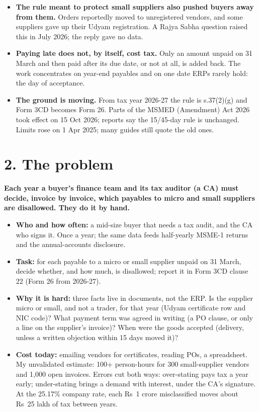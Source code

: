 \documentclass[10pt,a4paper]{article}
\providecommand{\tightlist}{\setlength{\itemsep}{1.5pt}\setlength{\parskip}{0pt}}
\begin{document}
\begin{itemize}
\tightlist
\item
  \textbf{The rule meant to protect small suppliers also pushed buyers away from them.} Orders reportedly moved to unregistered vendors, and some suppliers gave up their Udyam registration. A Rajya Sabha question raised this in July 2026; the reply gave no data.
\item
  \textbf{Paying late does not, by itself, cost tax.} Only an amount unpaid on 31 March and then paid after its due date, or not at all, is added back. The work concentrates on year-end payables and on one date ERPs rarely hold: the day of acceptance.
\item
  \textbf{The ground is moving.} From tax year 2026-27 the rule is s.37(2)(g) and Form 3CD becomes Form 26. Parts of the MSMED (Amendment) Act 2026 took effect on 15 Oct 2026; reports say the 15/45-day rule is unchanged. Limits rose on 1 Apr 2025; many guides still quote the old ones.
\end{itemize}

\section*{2. The problem}

\textbf{Each year a buyer's finance team and its tax auditor (a CA) must decide, invoice by invoice, which payables to micro and small suppliers are disallowed. They do it by hand.}

\begin{itemize}
\tightlist
\item
  \textbf{Who and how often:} a mid-size buyer that needs a tax audit, and the CA who signs it. Once a year; the same data feeds half-yearly MSME-1 returns and the annual-accounts disclosure.
\item
  \textbf{Task:} for each payable to a micro or small supplier unpaid on 31 March, decide whether, and how much, is disallowed; report it in Form 3CD clause 22 (Form 26 from 2026-27).
\item
  \textbf{Why it is hard:} three facts live in documents, not the ERP. Is the supplier micro or small, and not a trader, for that year (Udyam certificate row and NIC code)? What payment term was agreed in writing (a PO clause, or only a line on the supplier's invoice)? When were the goods accepted (delivery, unless a written objection within 15 days moved it)?
\item
  \textbf{Cost today:} emailing vendors for certificates, reading POs, a spreadsheet. My unvalidated estimate: 100+ person-hours for 300 small-supplier vendors and 1,000 open invoices. Errors cut both ways: over-stating pays tax a year early; under-stating brings a demand with interest, under the CA's signature. At the 25.17\% company rate, each Rs~1 crore misclassified moves about Rs~25 lakh of tax between years.
\end{itemize}
\end{document}
